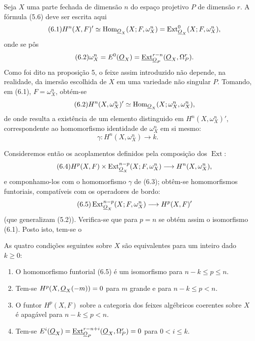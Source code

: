 
Seja $X$ uma parte fechada de dimensão $n$ do espaço projetivo $P$ de
dimensão $r$. A fórmula (5.6) deve ser escrita aqui
\begin{equation}\tag{6.1}
  H^{n}(X,F)'
  \simeq\operatorname{Hom}_{\underline{O}_X}(X;F,\omega_X^{n})
  =\operatorname{Ext}_{\underline{O}_X}^{0}(X;F,\omega_X^{n}),
\end{equation}
onde se pôs
\begin{equation}\tag{6.2}
  \omega_X^{n}=E^{0}(\underline{O}_X)
  =\underline{\operatorname{Ext}}_{\underline{O}_P}^{r-n}(\underline{O}_X,\Omega_P^{r}).
\end{equation}
Como foi dito na proposição 5, o feixe assim introduzido não depende,
na realidade, da imersão escolhida de $X$ em uma variedade não singular $P$.
Tomando, em (6.1), $F=\omega_X^{n}$, obtém-se
\begin{equation}\tag{6.2}
  H^{n}(X,\omega_X^{n})'
  \simeq\operatorname{Hom}_{\underline{O}_X}(X;\omega_X^{n},\omega_X^{n}),
\end{equation}
 de onde
resulta a existência de um elemento
distinguido em $H^{n}(X,\omega_X^{n})'$, correspondente ao homomorfismo
identidade de $\omega_X^{n}$ em si mesmo:
\begin{equation}\tag{6.3}
  \gamma:H^{n}(X,\omega_X^{n})\longrightarrow k.
\end{equation}

Consideremos então os acoplamentos definidos pela composição dos $\operatorname{Ext}$:
\begin{equation}\tag{6.4}
  H^{p}(X,F)\times
  \operatorname{Ext}_{\underline{O}_X}^{n-p}(X;F,\omega_X^{n})
  \longrightarrow H^{n}(X,\omega_X^{n}),
\end{equation}
e componhamo-los com o homomorfismo $\gamma$ de (6.3); obtêm-se
homomorfismos funtoriais, compatíveis com os operadores de bordo:
\begin{equation}\tag{6.5}
  \operatorname{Ext}_{\underline{O}_X}^{n-p}(X;F,\omega_X^{n})
  \longrightarrow H^{p}(X,F)'
\end{equation}
(que generalizam (5.2)). Verifica-se que para $p=n$ se obtém assim
o isomorfismo (6.1). Posto isto, tem-se o

 As quatro condições seguintes sobre $X$ são
equivalentes para um inteiro dado $k\geq0$:
\begin{enumerate}
  \item[\textit{i.}] O homomorfismo funtorial (6.5) é um isomorfismo para
    $n-k\leq p\leq n$.
  \item[\textit{ii.}] Tem-se $H^{p}(X,\underline{O}_X(-m))=0$ para $m$ grande e para
    $n-k\leq p<n$.
  \item[\textit{iii.}] O funtor $H^{p}(X,F)$ sobre a categoria dos feixes
    algébricos coerentes sobre $X$ é apagável para $n-k\leq p<n$.
  \item[\textit{iv.}] Tem-se
    $E^{i}(\underline{O}_X)=\underline{\operatorname{Ext}}_{\underline{O}_P}^{r-n+i}(\underline{O}_X,\Omega_P^{r})=0$
    para $0<i\leq k$.
\end{enumerate}

